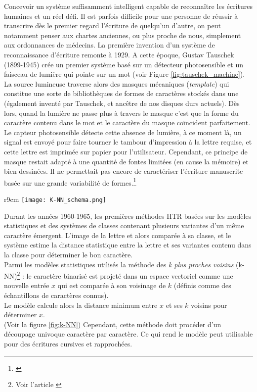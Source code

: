 Concevoir un système suffisamment intelligent capable de reconnaître les écritures humaines et un réel défi. Il est parfois difficile pour une personne de réussir à transcrire dès le premier regard l'écriture de quelqu'un d'autre, on peut notamment penser aux chartes anciennes, ou plus proche de nous, simplement aux ordonnances de médecins.
\newpage
La première invention d'un système de reconnaissance d'écriture remonte à 1929. A cette époque, Gustav Tauschek (1899-1945) crée un premier système basé sur un détecteur photosensible et un faisceau de lumière qui pointe sur un mot (voir Figure \ref{fig:tauschek_machine}). La source lumineuse traverse alors des masques mécaniques (\textit{template}) qui constitue une sorte de bibliothèques de formes de caractères stockés dans une  (également inventé par Tauschek, et ancêtre de nos disques durs actuels). Dès lors, quand la lumière ne passe plus à travers le masque c'est que la forme du caractère contenu dans le mot et le caractère du masque coïncident parfaitement. Le capteur photosensible détecte cette absence de lumière, à ce moment là, un signal est envoyé pour faire tourner le tambour d'impression à la lettre requise, et cette lettre est imprimée sur papier pour l'utilisateur. Cependant, ce principe de masque restait adapté à une quantité de fontes limitées (en cause la mémoire) et bien dessinées. Il ne permettait pas encore de caractériser l'écriture manuscrite basée sur une grande variabilité de formes.\footnote{\cite{ouji_segmentation_2012}}\\

\begin{wrapfigure}[20]{r}{9cm}
    \centering
    \texttt{[image: K-NN\_schema.png]}
    \caption{Illustration simplifiée de la \textit{méthode des k plus proches voisins} (k-NN) \textcopyright L. Terriel, 2020, Diagrams.net}
    \label{fig:k-NN}
\end{wrapfigure}

Durant les années 1960-1965, les premières méthodes HTR basées sur les modèles statistiques et des systèmes de classes contenant plusieurs variantes d'un même caractère émergent. L'image de la lettre et alors comparée à sa classe, et le système estime la distance statistique entre la lettre et ses variantes contenu dans la classe pour déterminer le bon caractère.\\

Parmi les modèles statistiques utilisés la méthode des \textit{k plus proches voisins} (k-NN)\footnote{Voir l'article \cite{noauthor_methode_2020}} : le caractère binarisé est projeté dans un espace vectoriel comme une nouvelle entrée $ x $ qui est comparée à son voisinage de $ k $ (définis comme des échantillons de caractères connus). \\ Le modèle calcule alors la distance minimum entre $ x $ et ses $ k $ voisins pour déterminer $ x $.\\ (Voir la figure \ref{fig:k-NN}) Cependant, cette méthode doit procéder d'un découpage univoque caractère par caractère. Ce qui rend le modèle peut utilisable pour des écritures cursives et rapprochées.\\

